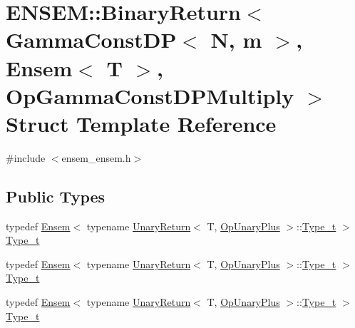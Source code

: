 \hypertarget{structENSEM_1_1BinaryReturn_3_01GammaConstDP_3_01N_00_01m_01_4_00_01Ensem_3_01T_01_4_00_01OpGammaConstDPMultiply_01_4}{}\section{E\+N\+S\+EM\+:\+:Binary\+Return$<$ Gamma\+Const\+DP$<$ N, m $>$, Ensem$<$ T $>$, Op\+Gamma\+Const\+D\+P\+Multiply $>$ Struct Template Reference}
\label{structENSEM_1_1BinaryReturn_3_01GammaConstDP_3_01N_00_01m_01_4_00_01Ensem_3_01T_01_4_00_01OpGammaConstDPMultiply_01_4}


{\ttfamily \#include $<$ensem\+\_\+ensem.\+h$>$}

\subsection*{Public Types}
\begin{DoxyCompactItemize}
\item 
typedef \mbox{\hyperlink{classENSEM_1_1Ensem}{Ensem}}$<$ typename \mbox{\hyperlink{structENSEM_1_1UnaryReturn}{Unary\+Return}}$<$ T, \mbox{\hyperlink{structENSEM_1_1OpUnaryPlus}{Op\+Unary\+Plus}} $>$\+::\mbox{\hyperlink{structENSEM_1_1BinaryReturn_3_01GammaConstDP_3_01N_00_01m_01_4_00_01Ensem_3_01T_01_4_00_01OpGammaConstDPMultiply_01_4_a839d901ca5cc60b6e639f680b072d368}{Type\+\_\+t}} $>$ \mbox{\hyperlink{structENSEM_1_1BinaryReturn_3_01GammaConstDP_3_01N_00_01m_01_4_00_01Ensem_3_01T_01_4_00_01OpGammaConstDPMultiply_01_4_a839d901ca5cc60b6e639f680b072d368}{Type\+\_\+t}}
\item 
typedef \mbox{\hyperlink{classENSEM_1_1Ensem}{Ensem}}$<$ typename \mbox{\hyperlink{structENSEM_1_1UnaryReturn}{Unary\+Return}}$<$ T, \mbox{\hyperlink{structENSEM_1_1OpUnaryPlus}{Op\+Unary\+Plus}} $>$\+::\mbox{\hyperlink{structENSEM_1_1BinaryReturn_3_01GammaConstDP_3_01N_00_01m_01_4_00_01Ensem_3_01T_01_4_00_01OpGammaConstDPMultiply_01_4_a839d901ca5cc60b6e639f680b072d368}{Type\+\_\+t}} $>$ \mbox{\hyperlink{structENSEM_1_1BinaryReturn_3_01GammaConstDP_3_01N_00_01m_01_4_00_01Ensem_3_01T_01_4_00_01OpGammaConstDPMultiply_01_4_a839d901ca5cc60b6e639f680b072d368}{Type\+\_\+t}}
\item 
typedef \mbox{\hyperlink{classENSEM_1_1Ensem}{Ensem}}$<$ typename \mbox{\hyperlink{structENSEM_1_1UnaryReturn}{Unary\+Return}}$<$ T, \mbox{\hyperlink{structENSEM_1_1OpUnaryPlus}{Op\+Unary\+Plus}} $>$\+::\mbox{\hyperlink{structENSEM_1_1BinaryReturn_3_01GammaConstDP_3_01N_00_01m_01_4_00_01Ensem_3_01T_01_4_00_01OpGammaConstDPMultiply_01_4_a839d901ca5cc60b6e639f680b072d368}{Type\+\_\+t}} $>$ \mbox{\hyperlink{structENSEM_1_1BinaryReturn_3_01GammaConstDP_3_01N_00_01m_01_4_00_01Ensem_3_01T_01_4_00_01OpGammaConstDPMultiply_01_4_a839d901ca5cc60b6e639f680b072d368}{Type\+\_\+t}}
\end{DoxyCompactItemize}


